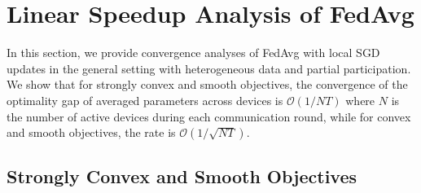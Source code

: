 


\section{Linear Speedup Analysis of FedAvg}

In this section, we provide convergence analyses of FedAvg with local
SGD updates in the general setting with heterogeneous data and partial
participation. We show that for strongly convex and smooth objectives,
the convergence of the optimality gap of averaged parameters across
devices is $\mathcal{O}(1/NT)$ where $N$ is the number of active
devices during each communication round, while for convex and smooth
objectives, the rate is $\mathcal{O}(1/\sqrt{NT})$. 

\subsection{Strongly Convex and Smooth Objectives}

